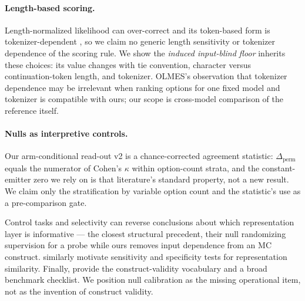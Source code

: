 \paragraph{Length-based scoring.}
Length-normalized likelihood can over-correct and its token-based form is tokenizer-dependent \citep{oostermeijer2026length}, so we claim no generic length sensitivity or tokenizer dependence of the scoring rule. We show the \emph{induced input-blind floor} inherits these choices: its value changes with tie convention, character versus continuation-token length, and tokenizer. OLMES's observation that tokenizer dependence may be irrelevant when ranking options for one fixed model and tokenizer is compatible with ours; our scope is cross-model comparison of the reference itself.

\paragraph{Nulls as interpretive controls.}
Our arm-conditional read-out v2 is a chance-corrected agreement statistic: $\Delta_{\mathrm{perm}}$ equals the numerator of Cohen's $\kappa$ \citep{cohen1960kappa} within option-count strata, and the constant-emitter zero we rely on is that literature's standard property, not a new result. We claim only the stratification by variable option count and the statistic's use as a pre-comparison gate.

Control tasks and selectivity can reverse conclusions about which representation layer is informative \citep{hewitt2019probes} --- the closest structural precedent, their null randomizing supervision for a probe while ours removes input dependence from an MC construct. \citet{ding2021grounding} similarly motivate sensitivity and specificity tests for representation similarity. Finally, \citet{bean2025measuring} provide the construct-validity vocabulary and a broad benchmark checklist. We position null calibration as the missing operational item, not as the invention of construct validity.
